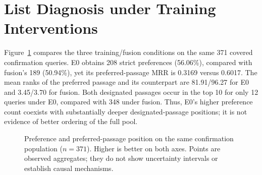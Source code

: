 \section{List Diagnosis under Training Interventions}
\label{sec:diagnosis}

Figure~\ref{fig:preference-position} compares the three training/fusion conditions on the same 371 covered confirmation queries. E0 obtains 208 strict preferences (56.06\%), compared with fusion's 189 (50.94\%), yet its preferred-passage MRR is 0.3169 versus 0.6017. The mean ranks of the preferred passage and its counterpart are 81.91/96.27 for E0 and 3.45/3.70 for fusion. Both designated passages occur in the top 10 for only 12 queries under E0, compared with 348 under fusion. Thus, E0's higher preference count coexists with substantially deeper designated-passage positions; it is not evidence of better ordering of the full pool.

\begin{figure}[b]
\centering
{}
\caption{Preference and preferred-passage position on the same confirmation population ($n=371$). Higher is better on both axes. Points are observed aggregates; they do not show uncertainty intervals or establish causal mechanisms.}
\label{fig:preference-position}
\end{figure}

